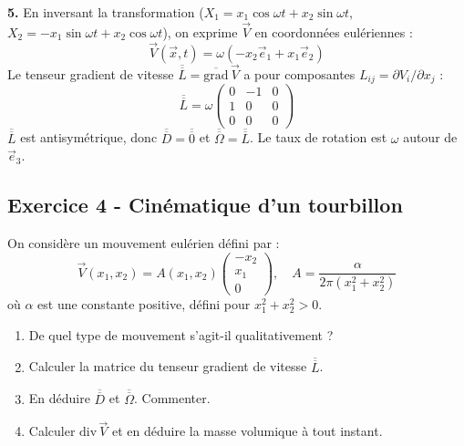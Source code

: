 \documentclass[12pt,a4paper]{article}
\begin{document}
\begin{boitecorrige}
\textbf{5.} En inversant la transformation ($X_1 = x_1\cos\omega t + x_2\sin\omega t$, $X_2 = -x_1\sin\omega t + x_2\cos\omega t$), on exprime $\vec{V}$ en coordonnées eulériennes :
\[
\vec{V}(\vec{x},t) = \omega(-x_2\vec{e}_1 + x_1\vec{e}_2)
\]
Le tenseur gradient de vitesse $\overline{\overline{L}} = \overline{\mathrm{grad}}\,\vec{V}$ a pour composantes $L_{ij} = \partial V_i/\partial x_j$ :
\[
\overline{\overline{L}} = \omega\begin{pmatrix}0&-1&0\\1&0&0\\0&0&0\end{pmatrix}
\]
$\overline{\overline{L}}$ est antisymétrique, donc $\overline{\overline{D}} = \overline{\overline{0}}$ et $\overline{\overline{\Omega}} = \overline{\overline{L}}$. Le taux de rotation est $\omega$ autour de $\vec{e}_3$.
\end{boitecorrige}

\subsection*{Exercice 4 - Cinématique d'un tourbillon \niveau{\moyen}}

\begin{boiteexercice}
On considère un mouvement eulérien défini par :
\[
\vec{V}(x_1,x_2) = A(x_1,x_2)\begin{pmatrix}-x_2\\x_1\\0\end{pmatrix}, \quad A = \frac{\alpha}{2\pi(x_1^2+x_2^2)}
\]
où $\alpha$ est une constante positive, défini pour $x_1^2+x_2^2 > 0$.
\begin{enumerate}
  \item De quel type de mouvement s'agit-il qualitativement ?
  \item Calculer la matrice du tenseur gradient de vitesse $\overline{\overline{L}}$.
  \item En déduire $\overline{\overline{D}}$ et $\overline{\overline{\Omega}}$. Commenter.
  \item Calculer $\mathrm{div}\,\vec{V}$ et en déduire la masse volumique à tout instant.
\end{enumerate}
\end{boiteexercice}
\end{document}
